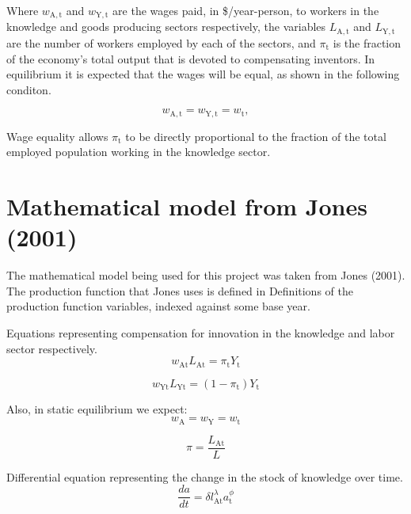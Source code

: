\documentclass[letterpaper,12pt]{article}
\begin{document}
Where $w_\mathrm{A,t}$ and $w_\mathrm{Y,t}$ are the wages paid, in \$/year-person, to workers in the knowledge and goods producing sectors respectively, the variables $L_\mathrm{A,t}$ and $L_\mathrm{Y,t}$ are the number of workers employed by each of the sectors, and $\pi_\mathrm{t}$ is the fraction of the economy's total output that is devoted to compensating inventors. In equilibrium it is expected that the wages will be equal, as shown in the following conditon.

\begin{equation} \label{eq:wage_equality}
w_\mathrm{A,t} = w_\mathrm{Y,t} = w_\mathrm{t},
\end{equation}

Wage equality allows $\pi_\mathrm{t}$ to be directly proportional to the fraction of the total employed population working in the knowledge sector.


\section{Mathematical model from Jones (2001)}

The mathematical model being used for this project was taken from Jones (2001). The production function that Jones uses is defined in 
Definitions of the production function variables, indexed against some base year.

Equations representing compensation for innovation in the knowledge and labor sector respectively.
\begin{equation}
w_\mathrm{At} L_\mathrm{At} = \pi_\mathrm{t} Y_\mathrm{t}
\end{equation}

\begin{equation}
w_\mathrm{Yt} L_\mathrm{Yt} = (1-\pi_\mathrm{t})Y_\mathrm{t}
\end{equation}

Also, in static equilibrium we expect:
\begin{equation}
w_\mathrm{A} = w_\mathrm{Y} = w_\mathrm{t}
\end{equation}

\begin{equation}
\pi = \frac{L_\mathrm{At}}{L}
\end{equation}

Differential equation representing the change in the stock of knowledge over time.
\begin{equation} \label{eq:da_dt}
\frac{da}{dt} = \delta l_\mathrm{At}^\lambda a_\mathrm{t}^\phi
\end{equation}
\end{document}
